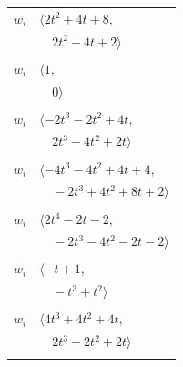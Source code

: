 \documentclass[11pt]{article}
\begin{document}
\begin{longtable}{@{}ll@{}}
$w_i$ & $\langle 2t^{2}+4t+8,$\\
 & $\quad 2t^{2}+4t+2\rangle$\\
\addlinespace[2pt]
\multicolumn{2}{@{}p{0.97\textwidth}@{}}{$i=7$, $D_i=1$, $\rho_{ij}$: $11{:}1, \allowbreak 17{:}1$}\\
$w_i$ & $\langle 1,$\\
 & $\quad 0\rangle$\\
\addlinespace[2pt]
\multicolumn{2}{@{}p{0.97\textwidth}@{}}{$i=8$, $D_i=1$, $\rho_{ij}$: $0{:}2, \allowbreak 5{:}1, \allowbreak 6{:}1, \allowbreak 9{:}1, \allowbreak 16{:}2, \allowbreak 17{:}2$}\\
$w_i$ & $\langle -2t^{3}-2t^{2}+4t,$\\
 & $\quad 2t^{3}-4t^{2}+2t\rangle$\\
\addlinespace[2pt]
\multicolumn{2}{@{}p{0.97\textwidth}@{}}{$i=9$, $D_i=1$, $\rho_{ij}$: $2{:}1, \allowbreak 3{:}1, \allowbreak 6{:}1, \allowbreak 8{:}2, \allowbreak 12{:}2, \allowbreak 14{:}2, \allowbreak 15{:}2$}\\
$w_i$ & $\langle -4t^{3}-4t^{2}+4t+4,$\\
 & $\quad -2t^{3}+4t^{2}+8t+2\rangle$\\
\addlinespace[2pt]
\multicolumn{2}{@{}p{0.97\textwidth}@{}}{$i=10$, $D_i=1$, $\rho_{ij}$: $1{:}1, \allowbreak 3{:}1, \allowbreak 4{:}1, \allowbreak 6{:}2, \allowbreak 11{:}1, \allowbreak 13{:}2, \allowbreak 17{:}2$}\\
$w_i$ & $\langle 2t^{4}-2t-2,$\\
 & $\quad -2t^{3}-4t^{2}-2t-2\rangle$\\
\addlinespace[2pt]
\multicolumn{2}{@{}p{0.97\textwidth}@{}}{$i=11$, $D_i=1$, $\rho_{ij}$: $3{:}2, \allowbreak 5{:}1, \allowbreak 7{:}2, \allowbreak 10{:}2, \allowbreak 16{:}2$}\\
$w_i$ & $\langle -t+1,$\\
 & $\quad -t^{3}+t^{2}\rangle$\\
\addlinespace[2pt]
\multicolumn{2}{@{}p{0.97\textwidth}@{}}{$i=12$, $D_i=1$, $\rho_{ij}$: $1{:}2, \allowbreak 3{:}2, \allowbreak 4{:}2, \allowbreak 5{:}1, \allowbreak 9{:}1, \allowbreak 15{:}2$}\\
$w_i$ & $\langle 4t^{3}+4t^{2}+4t,$\\
 & $\quad 2t^{3}+2t^{2}+2t\rangle$\\
\addlinespace[2pt]
\multicolumn{2}{@{}p{0.97\textwidth}@{}}{$i=13$, $D_i=1$, $\rho_{ij}$: $0{:}2, \allowbreak 1{:}1, \allowbreak 10{:}1, \allowbreak 15{:}1, \allowbreak 18{:}1, \allowbreak 19{:}1$}\\

\end{longtable}
\end{document}
